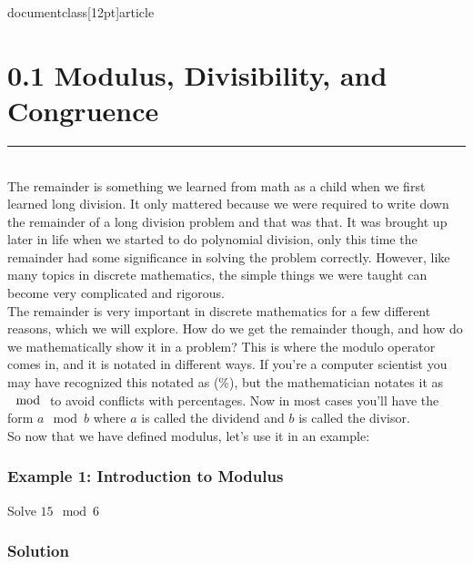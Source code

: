 documentclass[12pt]{article}
\usepackage[utf8]{inputenc}
\usepackage{amsmath}
\usepackage{amssymb}
\usepackage{setspace}
\usepackage{longdivision}
\usepackage[shortlabels]{enumitem}
\usepackage[margin=2cm]{geometry}


\onehalfspacing



\section*{0.1 Modulus, Divisibility, and Congruence}
\rule{500pt}{1pt} \\
\indent \indent The remainder is something we learned from math as a child when we first learned long division. It only mattered because we were required to write down the remainder of a long division problem and that was that. It was brought up later in life when we started to do polynomial division, only this time the remainder had some significance in solving the problem correctly. However, like many topics in discrete mathematics, the simple things we were taught can become very complicated and rigorous. \\
\indent \indent The remainder is very important in discrete mathematics for a few different reasons, which we will explore. How do we get the remainder though, and how do we mathematically show it in a problem? This is where the modulo operator comes in, and it is notated in different ways. If you're a computer scientist you may have recognized this notated as (\%), but the mathematician notates it as $\mod$ to avoid conflicts with percentages. Now in most cases you'll have the form $a \mod{b}$ where $a$ is called the dividend and $b$ is called the divisor. \\
\indent \indent So now that we have defined modulus, let's use it in an example:
\subsubsection*{Example 1: Introduction to Modulus}
\begin{center}
    Solve $15 \mod{6}$
\end{center}
\subsubsection*{Solution}
\begin{center}
\end{center}

